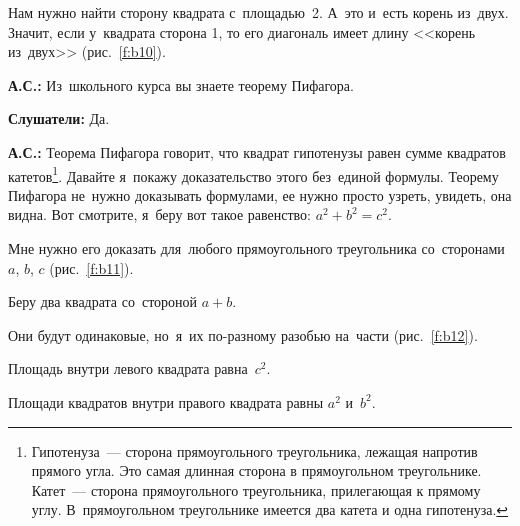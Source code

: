 
Нам нужно найти сторону квадрата с~площадью~2. А~это и~есть корень из~двух. Значит, если у~квадрата
сторона 1, то его диагональ имеет длину <<корень из~двух>> (рис.~\ref{f:b10}).


\textbf{А.С.:} Из~школьного курса вы знаете теорему Пифагора.

\textbf{Слушатели:} Да.

\textbf{А.С.:} Теорема Пифагора говорит, что квадрат гипотенузы равен сумме квадратов катетов\footnote{Гипотенуза~---
сторона прямоугольного треугольника, лежащая напротив прямого угла. Это самая
длинная сторона в прямоугольном треугольнике.
Катет~--- сторона прямоугольного треугольника, прилегающая к прямому углу.
В~прямоугольном треугольнике имеется два катета и одна гипотенуза.}. Давайте
я~покажу доказательство этого без~единой формулы. Теорему Пифагора не~нужно доказывать формулами,
ее нужно просто узреть, увидеть, она видна. Вот смотрите, я~беру вот такое равенство:
$a^{2}+b^{2}=c^{2}$.

\pagebreak

Мне нужно его доказать для~любого прямоугольного треугольника со~сторонами $a$, $b$, $c$ (рис.~\ref{f:b11}).


Беру два квадрата со~стороной $a+b$.

Они будут одинаковые, но~я~их по-разному разобью на~части (рис.~\ref{f:b12}).


Площадь внутри левого квадрата равна~$c^{2}$.

Площади квадратов внутри правого квадрата равны $a^{2}$ и~$b^{2}$.


